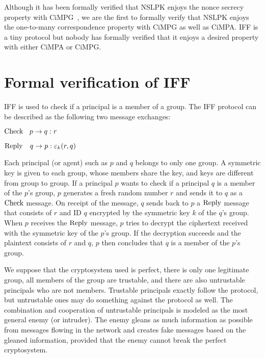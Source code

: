 \documentclass[10pt, conference, compsocconf]{IEEEtran}
\begin{document}
Although it has been formally verified that NSLPK enjoys the nonce secrecy property with CiMPG~\cite{RiescoO18tosem}, we are the first to formally verify that NSLPK enjoys the one-to-many correspondence property with CiMPG as well as CiMPA. IFF is a tiny protocol but nobody has formally verified that it enjoys a desired property with either CiMPA or CiMPG. 

\section{Formal verification of IFF}
\label{sect_iff}
IFF \cite{iff2001} is used to check if a principal is a member of a group. The IFF protocol can be described as the following two message exchanges:

${\rm Check} \ \ \: p \rightarrow q : r$

${\rm Reply}  \ \ \ q \rightarrow p : \varepsilon_k(r,q)$

\noindent
Each principal (or agent) such as $p$ and $q$ belongs to only one group.
A symmetric key is given to each group, whose members share the key, and keys are different from group to group. If a principal $p$ wants to check if a principal $q$ is a member of the $p$'s group, $p$ generates a fresh random number $r$ and sends it to $q$ as a $\rm Check$ message. 
On receipt of the message, $q$ sends back to $p$ a $\rm Reply$ message that consists of $r$ and ID $q$ encrypted by the symmetric key $k$ of the $q$'s group. 
When $p$ receives the $\rm Reply$ message, $p$ tries to decrypt the ciphertext received with the symmetric key of the $p$'s group. 
If the decryption succeeds and the plaintext consists of $r$ and $q$, $p$ then concludes that $q$ is a member of the $p$'s group. 

We suppose that the cryptosystem used is perfect, there is only one legitimate group, all members of the group are trustable, and there are also untrustable principals who are not members. Trustable principals exactly follow the protocol, but untrustable ones may do something against the protocol as well. The combination and cooperation of untrustable principals is modeled as the most general enemy (or intruder). The enemy gleans as much information as possible from messages flowing in the network and creates fake messages based on the gleaned information, provided that the enemy cannot break the perfect cryptosystem.
\end{document}
